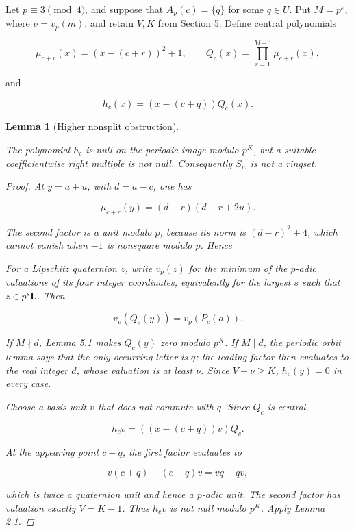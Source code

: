 \documentclass[11pt]{article}
\newtheorem{lemma}[theorem]{Lemma}
\numberwithin{equation}{section}
\begin{document}
Let $p\equiv3\pmod4$, and suppose that
$A_p(c)=\{q\}$ for some $q\in U$. Put $M=p^\nu$, where
$\nu=v_p(m)$, and retain $V,K$ from Section 5. Define central polynomials

\nopagebreak[4]
\[
\mu_{c+r}(x)=(x-(c+r))^2+1,
\qquad
Q_c(x)=\prod_{r=1}^{M-1}\mu_{c+r}(x),
\]

and

\nopagebreak[4]
\[
h_c(x)=(x-(c+q))Q_c(x).
\]

\begin{lemma}[Higher nonsplit obstruction]
\label{lem:nonsplit-obstruction}

The polynomial $h_c$ is null on the periodic image modulo $p^K$, but a
suitable coefficientwise right multiple is not null. Consequently $S_w$ is
not a ringset.

\begin{proof}

At $y=a+u$, with $d=a-c$, one has

\nopagebreak[4]
\[
\mu_{c+r}(y)=(d-r)(d-r+2u).
\]

The second factor is a unit modulo $p$, because its norm is
$(d-r)^2+4$, which cannot vanish when $-1$ is nonsquare modulo $p$. Hence

For a Lipschitz quaternion $z$, write $v_p(z)$ for the minimum of the
$p$-adic valuations of its four integer coordinates, equivalently for the
largest $s$ such that $z\in p^s\mathbf L$. Then

\nopagebreak[4]
\[
v_p(Q_c(y))=v_p(P_c(a)).
\]

If $M\nmid d$, Lemma 5.1 makes $Q_c(y)$ zero modulo $p^K$. If $M\mid d$,
the periodic orbit lemma says that the only occurring letter is $q$; the
leading factor then evaluates to the real integer $d$, whose valuation is
at least $\nu$. Since $V+\nu\ge K$, $h_c(y)=0$ in every case.

Choose a basis unit $v$ that does not commute with $q$. Since $Q_c$ is
central,

\nopagebreak[4]
\[
h_cv=((x-(c+q))v)Q_c.
\]

At the appearing point $c+q$, the first factor evaluates to

\nopagebreak[4]
\[
v(c+q)-(c+q)v=vq-qv,
\]

which is twice a quaternion unit and hence a $p$-adic unit. The second
factor has valuation exactly $V=K-1$. Thus $h_cv$ is not null modulo $p^K$.
Apply Lemma 2.1.
\end{proof}

\end{lemma}
\end{document}
